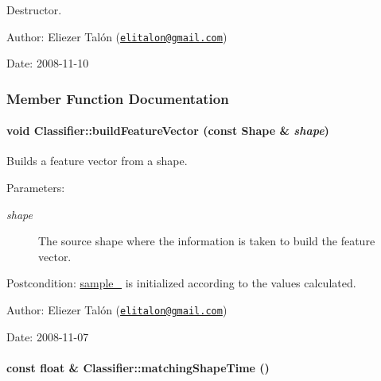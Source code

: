 Destructor. 

\begin{Desc}
\item[Author:]Eliezer Talón (\href{mailto:elitalon@gmail.com}{\tt elitalon@gmail.com}) \end{Desc}
\begin{Desc}
\item[Date:]2008-11-10 \end{Desc}


\subsubsection{Member Function Documentation}
\hypertarget{class_classifier_6c5a7ef6298b0f0d84873297f1e8c7e9}{
\paragraph[{buildFeatureVector}]{\setlength{\rightskip}{0pt plus 5cm}void Classifier::buildFeatureVector (const {\bf Shape} \& {\em shape})}\hfill}
\label{class_classifier_6c5a7ef6298b0f0d84873297f1e8c7e9}


Builds a feature vector from a shape. 

\begin{Desc}
\item[Parameters:]
\begin{description}
\item[{\em shape}]The source shape where the information is taken to build the feature vector.\end{description}
\end{Desc}
\begin{Desc}
\item[Postcondition:]\hyperlink{class_classifier_3d46e3d6546304f24db6d9402375988a}{sample\_\-} is initialized according to the values calculated.\end{Desc}
\begin{Desc}
\item[Author:]Eliezer Talón (\href{mailto:elitalon@gmail.com}{\tt elitalon@gmail.com}) \end{Desc}
\begin{Desc}
\item[Date:]2008-11-07 \end{Desc}
\hypertarget{class_classifier_775756b0f6e5472a13bb1fa15290f14c}{
\paragraph[{matchingShapeTime}]{\setlength{\rightskip}{0pt plus 5cm}const float \& Classifier::matchingShapeTime ()}\hfill}
\label{class_classifier_775756b0f6e5472a13bb1fa15290f14c}


